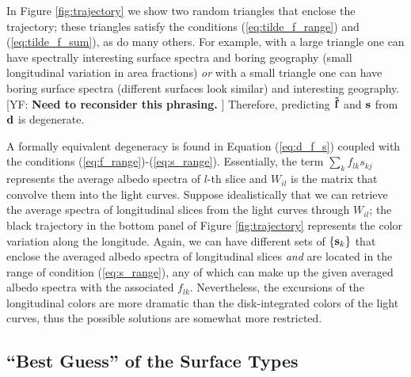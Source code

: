 \documentclass[iop,numberedappendix,apj,]{emulateapj}
\def\fast{\tilde f}
\def\memoYF#1{\color{red}[YF: {\bf #1}]\color{black}}
\begin{document}

In Figure \ref{fig:trajectory} we show two random triangles that enclose the trajectory; these triangles satisfy the conditions (\ref{eq:tilde_f_range}) and (\ref{eq:tilde_f_sum}), as do many others. 
For example, with a large triangle one can have spectrally interesting surface spectra and boring geography (small longitudinal variation in area fractions) {\it or} with a small triangle one can have boring surface spectra (different surfaces look similar) and interesting geography. \memoYF{Need to reconsider this phrasing. }
Therefore, predicting ${\bf \fast }$ and ${\bf s}$ from ${\bf d}$ is degenerate.  

A formally equivalent degeneracy is found in Equation (\ref{eq:d_f_s}) coupled with the conditions (\ref{eq:f_range})-(\ref{eq:s_range}). 
Essentially, the term $\sum _k f_{lk} s_{kj}$ represents the average albedo spectra of $l$-th slice and $W_{il}$ is the matrix that convolve them into the light curves. 
Suppose idealistically that we can retrieve the average spectra of longitudinal slices from the light curves through $W_{il}$; the black trajectory in the bottom panel of Figure \ref{fig:trajectory} represents the color variation along the longitude.  
Again, we can have different sets of $\{ {\bf s}_k \}$ that enclose the averaged albedo spectra of longitudinal slices {\it and} are located in the range of condition (\ref{eq:s_range}), any of which can make up the given averaged albedo spectra with the associated $f_{lk}$. 
Nevertheless, the excursions of the longitudinal colors are more dramatic than the disk-integrated colors of the light curves, thus the possible solutions are somewhat more restricted. 


\subsection{``Best Guess'' of the Surface Types}
\label{ss:guess}
\end{document}
